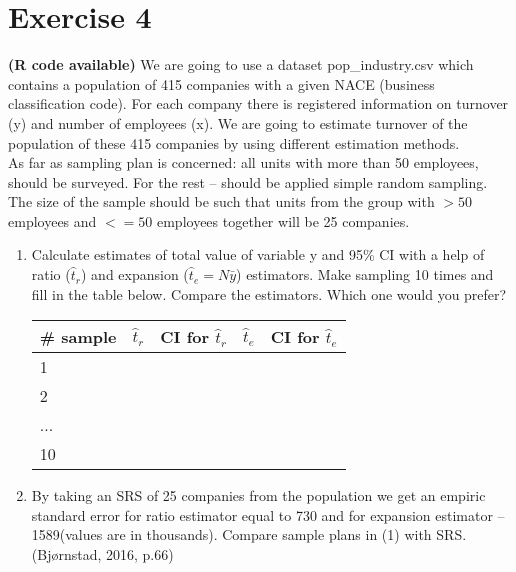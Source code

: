 \documentclass[12pt]{article}
\begin{document}
\section*{Exercise 4}
\textbf{\color{ForestGreen}(R code available)} We are going to use a dataset pop\_industry.csv which contains a population of 415 companies with a given NACE (business classification code). For each company there is registered information on turnover (y) and number of employees (x). We are going to estimate turnover of the population of these 415 companies by using different estimation methods.\\
As far as sampling plan is concerned: all units with more than 50 employees, should be surveyed. For the rest – should be applied simple random sampling. The size of the sample should be such that units from the group with $> 50$ employees and $<= 50$ employees together will be 25 companies. 
\begin{enumerate}
\item Calculate estimates of total value of variable y and 95\% CI with a help of ratio ($\hat{t}_r$) and expansion ($\hat{t}_{e} = N\bar{y}$) estimators. Make sampling 10 times and fill in the table below. Compare the estimators. Which one would you prefer?\\
\begin{center}
\begin{tabular}{l||c|c|c|c}
\# sample & $\hat{t}_r$ & CI for $\hat{t}_r$ & $\hat{t}_{e}$ & CI for $\hat{t}_{e}$ \\
\hline
\hline
1&&&&\\
\hline
2&&&&\\
\hline
...&&&&\\
\hline
10&&&&\\
\end{tabular}
\end{center}
\item By taking an SRS of 25 companies from the population we get an empiric standard error for ratio estimator equal to 730 and for expansion estimator – 1589(values are in thousands). Compare sample plans in (1) with SRS.\hfill(Bjørnstad, 2016, p.66)
\end{enumerate}
\end{document}
